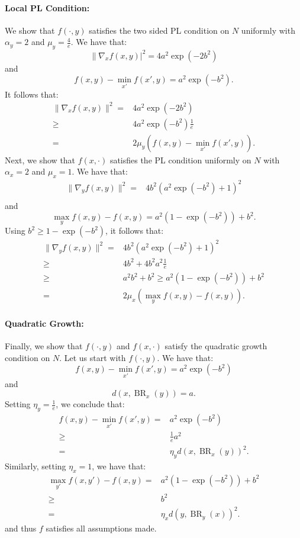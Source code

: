 \documentclass{article}
\DeclareMathOperator{\BR}{BR}
\begin{document}
\paragraph{Local PL Condition:} We show that $f(\cdot,y)$ satisfies the two sided PL condition on $N$ uniformly with $\alpha_y=2$ and $\mu_y=\frac{4}{e}$. We have that:
\[
\|\nabla_x f(x,y)|^2 = 4a^2 \exp\left(-2b^2\right)
\]
and
\[
f(x,y) - \min_{x'} f(x',y) = a^2 \exp\left(-b^2\right) .
\]
It follows that:
\begin{align*}
    \|\nabla_x f(x,y)\|^2 = & 4a^2 \exp\left(-2b^2\right) \\
    \geq & 4a^2 \exp\left(-b^2\right) \frac{1}{e}\\
    = & 2\mu_y\left(f(x,y) - \min_{x'} f(x',y)\right).
\end{align*}
Next, we show that $f(x,\cdot)$ satisfies the PL condition uniformly on $N$ with $\alpha_x=2$ and $\mu_x=1$. We have that:
\begin{align*}
    \|\nabla_y f(x,y)\|^2 = & 4b^2\left(a^2 \exp\left(-b^2\right) + 1\right)^2\\
    \end{align*}
and
\[
\max_y f(x,y) - f(x,y) = a^2 (1-\exp\left(-b^2\right)) + b^2.
\]
Using $b^2 \geq 1- \exp\left(-b^2\right)$, it follows that:
\begin{align*}
    \|\nabla_y f(x,y)\|^2 = & 4b^2\left(a^2 \exp\left(-b^2\right) + 1 \right)^2\\
    \geq & 4b^2 + 4b^2a^2 \frac{1}{e}\\
    \geq & a^2b^2 + b^2
    \geq a^2(1-\exp\left(-b^2\right)) + b^2\\
    = & 2\mu_x\left(\max_y f(x,y) - f(x,y)\right).
\end{align*}
\paragraph{Quadratic Growth:} Finally, we show that $f(\cdot,y)$ and $f(x,\cdot)$ satisfy the quadratic growth condition on $N$. Let us start with $f(\cdot,y)$. We have that:
\[
 f(x,y) - \min_{x'} f(x',y)  = a^2 \exp\left(-b^2\right) 
\]
and 
\[
d(x,\BR_x(y)) = a.
\]
Setting $\eta_y = \frac{1}{e}$, we conclude that:
\begin{align*}
    f(x,y) - \min_{x'} f(x',y) = & a^2 \exp\left(-b^2\right) \\
    \geq & \frac{1}{e} a^2 \\
    = & \eta_y d(x,\BR_x(y))^2.
\end{align*}
Similarly, setting $\eta_x = 1$, we have that:
\begin{align*}
    \max_{y'} f(x,y') - f(x,y) = & a^2 (1-\exp\left(-b^2\right)) + b^2\\
    \geq & b^2\\
    = & \eta_x d(y,\BR_y(x))^2.
\end{align*}
and thus $f$ satisfies all assumptions made. 
\end{document}
